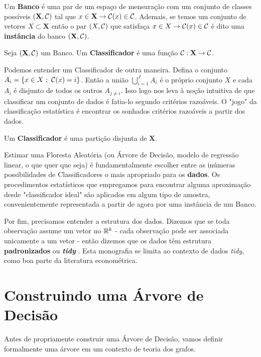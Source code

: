 \begin{defi}
Um \textbf{Banco} é uma par de um espaço de mensuração com um conjunto de classes possíveis $(\mathbf{X}, \mathcal{C})$ tal que $x \in \mathbf{X} \to \mathcal{C}(x) \in \mathcal{C}$. Ademais, se temos um conjunto de vetores $X \subset \mathbf{X}$ então o par $(X, \mathcal{C})$ que satisfaça $x \in X \to \mathcal{C}(x) \in \mathcal{C}$ é dito uma \textbf{instância} do banco $(\mathbf{X}, \mathcal{C})$.
\end{defi}

\begin{defi} Seja $(\mathbf{X}, \mathcal{C})$ um Banco. Um \textbf{Classificador} é uma função $\mathcal{C}: \mathbf{X} \to \mathcal{C}$.
\end{defi}

Podemos entender um Classificador de outra maneira. Defina o conjunto $A_i = \{ x \in X \,\, ; \,\, \mathcal{C}(x) = i\}$. Então a união $\bigcup_{i = 1}^J A_i$ é o próprio conjunto $X$ e cada $A_i$ é disjunto de todos os outros $A_{j \neq i}$. Isso logo nos leva à noção intuitiva de que classificar um conjunto de dados é fatia-lo segundo critérios razoáveis. O "jogo" da classificação estatística é encontrar os sonhados critérios razoáveis a partir dos dados.

\begin{defi}
Um \textbf{Classificador} é uma partição disjunta de $\mathbf{X}$.
\end{defi}

Estimar uma Floresta Aleatória (ou Árvore de Decisão, modelo de regressão linear, o que quer que seja) é fundamentalmente escolher entre as inúmeras possibilidades de Classificadores o mais apropriado para os \textbf{dados}. Os procedimentos estatísticos que empregamos para encontrar alguma aproximação desde "classificador ideal" são aplicados em algum tipo de amostra, convenientemente representada a partir de agora por uma instância de um Banco.

Por fim, precisamos entender a estrutura dos dados. Dizemos que se toda observação assume um vetor no $\mathbb{R}^k$ - cada observação pode ser associada unicamente a um vetor - então dizemos que os dados têm estrutura \textbf{padronizados} ou \textbf{\textit{tidy}} \cite{tidyr}. Esta monografia se limita ao contexto de dados \textit{tidy}, como boa parte da literatura econométrica.

\section{Construindo uma Árvore de Decisão}

Antes de propriamente construir uma Árvore de Decisão, vamos definir formalmente uma árvore em um contexto de teoria dos grafos. 

